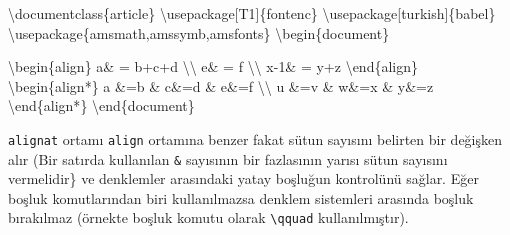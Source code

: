 \documentclass[
  letterpaper,
  DIV=11,
  numbers=noendperiod]{scrreprt}
\newenvironment{Shaded}{\begin{snugshade}}{\end{snugshade}}
\newcommand{\BuiltInTok}[1]{\textcolor[rgb]{0.00,0.23,0.31}{#1}}
\newcommand{\ExtensionTok}[1]{\textcolor[rgb]{0.00,0.23,0.31}{#1}}
\newcommand{\KeywordTok}[1]{\textcolor[rgb]{0.00,0.23,0.31}{#1}}
\newcommand{\NormalTok}[1]{\textcolor[rgb]{0.00,0.23,0.31}{#1}}
\newcommand{\SpecialCharTok}[1]{\textcolor[rgb]{0.37,0.37,0.37}{#1}}
\newcommand{\SpecialStringTok}[1]{\textcolor[rgb]{0.13,0.47,0.30}{#1}}
\begin{document}
\begin{Shaded}
\begin{Highlighting}[]
\BuiltInTok{\textbackslash{}documentclass}\NormalTok{\{}\ExtensionTok{article}\NormalTok{\}}
\BuiltInTok{\textbackslash{}usepackage}\NormalTok{[T1]\{}\ExtensionTok{fontenc}\NormalTok{\}}
\BuiltInTok{\textbackslash{}usepackage}\NormalTok{[turkish]\{}\ExtensionTok{babel}\NormalTok{\}}
\BuiltInTok{\textbackslash{}usepackage}\NormalTok{\{}\ExtensionTok{amsmath,amssymb,amsfonts}\NormalTok{\}}
\KeywordTok{\textbackslash{}begin}\NormalTok{\{}\ExtensionTok{document}\NormalTok{\}}

\KeywordTok{\textbackslash{}begin}\NormalTok{\{}\ExtensionTok{align}\NormalTok{\}}
\SpecialStringTok{   a\& = b+c+d }\SpecialCharTok{\textbackslash{}\textbackslash{}}
\SpecialStringTok{   e\& = f }\SpecialCharTok{\textbackslash{}\textbackslash{}}
\SpecialStringTok{ x{-}1\& = y+z }
\KeywordTok{\textbackslash{}end}\NormalTok{\{}\ExtensionTok{align}\NormalTok{\}}
\KeywordTok{\textbackslash{}begin}\NormalTok{\{}\ExtensionTok{align*}\NormalTok{\}}
\SpecialStringTok{ a \&=b \& c\&=d \& e\&=f }\SpecialCharTok{\textbackslash{}\textbackslash{}}
\SpecialStringTok{ u \&=v \& w\&=x \& y\&=z}
\KeywordTok{\textbackslash{}end}\NormalTok{\{}\ExtensionTok{align*}\NormalTok{\}}
\KeywordTok{\textbackslash{}end}\NormalTok{\{}\ExtensionTok{document}\NormalTok{\}}
\end{Highlighting}
\end{Shaded}

\texttt{alignat} ortamı \texttt{align} ortamına benzer fakat sütun
sayısını belirten bir değişken alır (Bir satırda kullanılan \texttt{\&}
sayısının bir fazlasının yarısı sütun sayısını vermelidir\} ve
denklemler arasındaki yatay boşluğun kontrolünü sağlar. Eğer boşluk
komutlarından biri kullanılmazsa denklem sistemleri arasında boşluk
bırakılmaz (örnekte boşluk komutu olarak \texttt{\textbackslash{}qquad}
kullanılmıştır).
\end{document}
